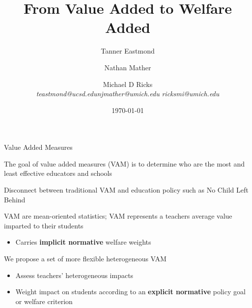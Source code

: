 \documentclass[t,aspectratio=169,11pt]{beamer}
\title{From Value Added to Welfare Added}
\author{Tanner Eastmond \hfill \and Nathan Mather   \and \hfill Michael D Ricks   \\   \textit{teastmond@ucsd.edu}\hfill \textit{njmather{\fontfamily{qag}\selectfont @}umich.edu} \hfill
\textit{ricksmi{\fontfamily{qag}\selectfont @}umich.edu} }
\institute{}
\date{\today}
\newenvironment{wideitemize}{\itemize\addtolength{\itemsep}{14pt}}{\enditemize}
\begin{document}
\begin{frame}
\titlepage 
\end{frame}

\begin{frame}{Value Added Measures}
\begin{wideitemize}
    \item The goal of value added measures (VAM) is to determine who are the most and least effective educators and schools
    
    \item Disconnect between traditional VAM and education policy such as No Child Left Behind
    
    \item VAM are mean-oriented statistics; VAM represents a teachers average value imparted to their students
    
    \begin{itemize}
        \vspace{2mm}
        \item Carries \textbf{implicit normative} welfare weights 
    \end{itemize}
    
    \item  We propose a set of more flexible heterogeneous VAM 
    \begin{itemize}
        \vspace{2mm}
        \setlength{\itemsep}{2mm}
        \item Assess teachers' heterogeneous impacts
        \item  Weight impact on students according to an \textbf{explicit normative} policy goal or welfare criterion
    \end{itemize}

\end{wideitemize}

\end{frame}

\end{document}
